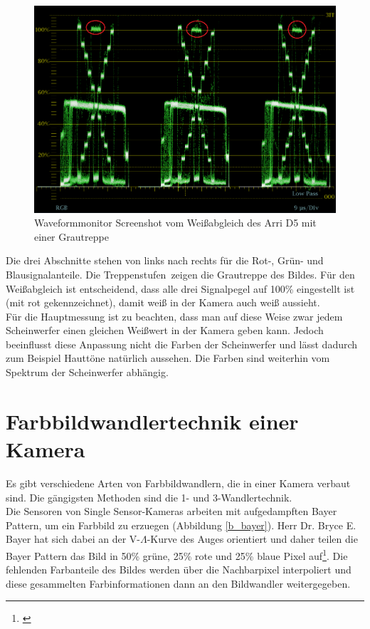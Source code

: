 \begin{figure}[H]     %
\centering
\includegraphics[width=1.0\textwidth]{bilder/arri} 
\caption {Waveformmonitor Screenshot vom Weißabgleich des Arri D5 mit einer Grautreppe}\label{b_wb}
\end{figure}


Die drei Abschnitte stehen von links nach rechts für die Rot-, Grün- und Blausignalanteile. Die \glqq Treppenstufen\grqq\ zeigen die Grautreppe des Bildes. Für den Weißabgleich ist entscheidend, dass alle drei Signalpegel auf 100\% eingestellt ist (mit rot gekennzeichnet), damit weiß in der Kamera auch weiß aussieht. \\
Für die Hauptmessung ist zu beachten, dass man auf diese Weise zwar jedem Scheinwerfer einen gleichen Weißwert in der Kamera geben kann. Jedoch beeinflusst diese Anpassung nicht die Farben der Scheinwerfer und lässt dadurch zum Beispiel Hauttöne natürlich aussehen. Die Farben sind weiterhin vom Spektrum der Scheinwerfer abhängig.

\section{Farbbildwandlertechnik einer Kamera}
\label{sec_wandler}
Es gibt verschiedene Arten von Farbbildwandlern, die in einer Kamera verbaut sind. Die gängigsten Methoden sind die 1- und 3-Wandlertechnik.\\
Die Sensoren von \glqq Single Sensor\grqq -Kameras arbeiten mit aufgedampften Bayer Pattern, um ein Farbbild zu erzuegen (Abbildung \ref{b_bayer}). Herr Dr. Bryce E. Bayer hat sich dabei an der V-$\Lambda$-Kurve des Auges orientiert und daher teilen die Bayer Pattern das Bild in 50\% grüne, 25\% rote und 25\% blaue Pixel auf\footnote{\cite{itwissen}}. Die fehlenden Farbanteile des Bildes werden über die Nachbarpixel interpoliert und diese gesammelten Farbinformationen dann an den Bildwandler weitergegeben.

